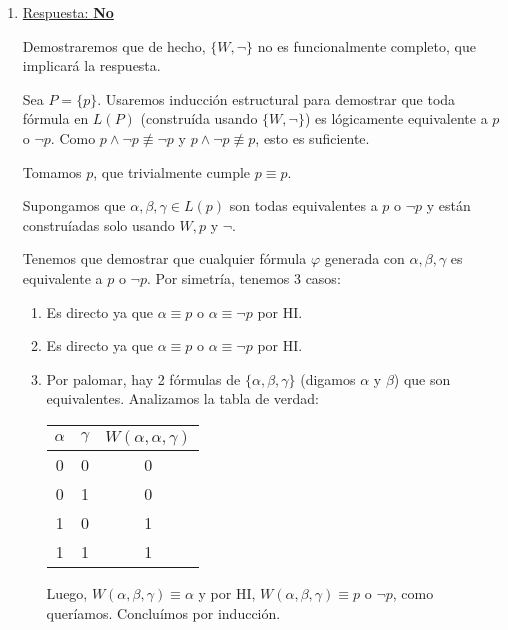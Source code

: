 \begin{enumerate}
    \item \underline{Respuesta: \textbf{No}} 
    
    Demostraremos que de hecho, $\{W,\neg\}$ no es funcionalmente completo, que implicará la respuesta.

    Sea $P=\{p\}$. Usaremos inducción estructural para demostrar que toda fórmula en $L(P)$ (construída usando $\{W,\neg\}$) es lógicamente equivalente a $p$ o $\neg p$. Como $p\land \neg p \not\equiv \neg p$ y $p\land \neg p \not\equiv p$, esto es suficiente.
    \begin{CB}
        Tomamos $p$, que trivialmente cumple $p\equiv p$.
    \end{CB}
    \begin{HI}
        Supongamos que $\alpha, \beta,\gamma\in L(p)$ son todas equivalentes a $p$ o $\neg p$ y están construíadas solo usando $W, p$ y $\neg$.
    \end{HI}
    \begin{TI}
        Tenemos que demostrar que cualquier fórmula $\varphi$ generada con $\alpha, \beta,\gamma$ es equivalente a $p$ o $\neg p$. Por simetría, tenemos 3 casos:
        \begin{enumerate}
            \item \boxed{\varphi= \alpha} Es directo ya que $\alpha \equiv p$ o $\alpha \equiv \neg p$ por HI.
            \item \boxed{\varphi=\neg \alpha} Es directo ya que $\alpha \equiv p$ o $\alpha \equiv \neg p$ por HI.
            \item {} Por palomar, hay 2 fórmulas de $\{\alpha,\beta,\gamma\}$ (digamos $\alpha$ y $\beta$) que son equivalentes. Analizamos la tabla de verdad:
\begin{center}
\begin{tabular}{ccc}
$\alpha$ & $\gamma$ & $W(\alpha,\alpha,\gamma)$ \\
\midrule
0 & 0 & 0 \\
0 & 1 & 0 \\
1 & 0 & 1 \\
1 & 1 & 1 \\
\end{tabular}
\end{center}
Luego, $W(\alpha,\beta,\gamma)\equiv \alpha$ y por HI, $W(\alpha,\beta,\gamma)\equiv p$ o $\neg p$, como queríamos. Concluímos por inducción.
        \end{enumerate}
    \end{TI}
    

\end{enumerate}
